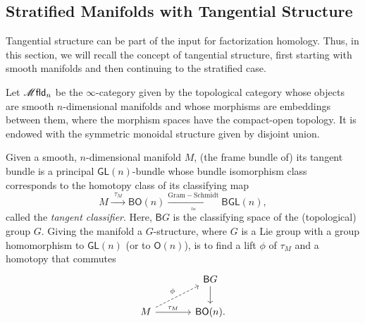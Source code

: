 \documentclass[../text]{subfiles}
\begin{document}
\subsection{Stratified Manifolds with Tangential Structure}

Tangential structure can be part of the input for factorization homology. Thus, in this section, we will recall the concept of tangential structure, first starting with smooth manifolds and then continuing to the stratified case.

\begin{definition}
    Let $\mfld_n$ be the $\infty$-category given by the topological category whose objects are smooth $n$-dimensional manifolds and whose morphisms are embeddings between them, where the morphism spaces have the compact-open topology. It is endowed with the symmetric monoidal structure given by disjoint union.
\end{definition}

Given a smooth, $n$-dimensional manifold $M$, (the frame bundle of) its tangent bundle is a principal $\mathsf{GL}(n)$-bundle whose bundle isomorphism class corresponds to the homotopy class of its classifying map
%
\begin{equation}
    M \xrightarrow{\ \ \tau_M \ \ } \mathsf{BO}(n) \xrightarrow[\simeq]{\mathrm{Gram-Schmidt}} \mathsf{BGL}(n),
\end{equation}
called the \emph{tangent classifier}. Here, $\mathsf{B}G$ is the classifying space of the (topological) group $G$. Giving the manifold a $G$-structure, where $G$ is a Lie group with a group homomorphism to $\mathsf{GL}(n)$ (or to $\mathsf{O}(n)$), is to find a lift $\phi$ of $\tau_M$ and a homotopy that commutes
%
\begin{equation}
    \begin{tikzcd}[column sep = large]
        & \mathsf{B}G \arrow[d] \\
        M \arrow[ru, dashed, "\phi"] \arrow[r, "\tau_M"] & \mathsf{BO}(n).
    \end{tikzcd}
\end{equation}
\end{document}
